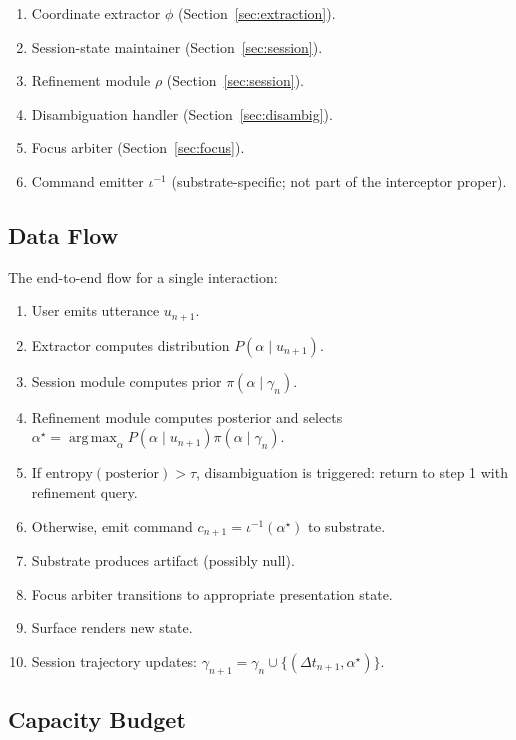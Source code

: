 \documentclass[11pt,twocolumn,a4paper]{article}
\theoremstyle{definition}
\theoremstyle{remark}
\DeclareMathOperator*{\argmax}{arg\,max}
\begin{document}
\begin{enumerate}
    \item Coordinate extractor $\phi$ (Section~\ref{sec:extraction}).
    \item Session-state maintainer (Section~\ref{sec:session}).
    \item Refinement module $\rho$ (Section~\ref{sec:session}).
    \item Disambiguation handler (Section~\ref{sec:disambig}).
    \item Focus arbiter (Section~\ref{sec:focus}).
    \item Command emitter $\iota^{-1}$ (substrate-specific; not part of the interceptor proper).
\end{enumerate}

\subsection{Data Flow}

The end-to-end flow for a single interaction:

\begin{enumerate}
    \item User emits utterance $u_{n+1}$.
    \item Extractor computes distribution $P(\alpha \mid u_{n+1})$.
    \item Session module computes prior $\pi(\alpha \mid \gamma_n)$.
    \item Refinement module computes posterior and selects $\alpha^\star = \argmax_\alpha P(\alpha \mid u_{n+1}) \pi(\alpha \mid \gamma_n)$.
    \item If $\mathrm{entropy}(\text{posterior}) > \tau$, disambiguation is triggered: return to step 1 with refinement query.
    \item Otherwise, emit command $c_{n+1} = \iota^{-1}(\alpha^\star)$ to substrate.
    \item Substrate produces artifact (possibly null).
    \item Focus arbiter transitions to appropriate presentation state.
    \item Surface renders new state.
    \item Session trajectory updates: $\gamma_{n+1} = \gamma_n \cup \{(\Delta t_{n+1}, \alpha^\star)\}$.
\end{enumerate}

\subsection{Capacity Budget}
\end{document}
